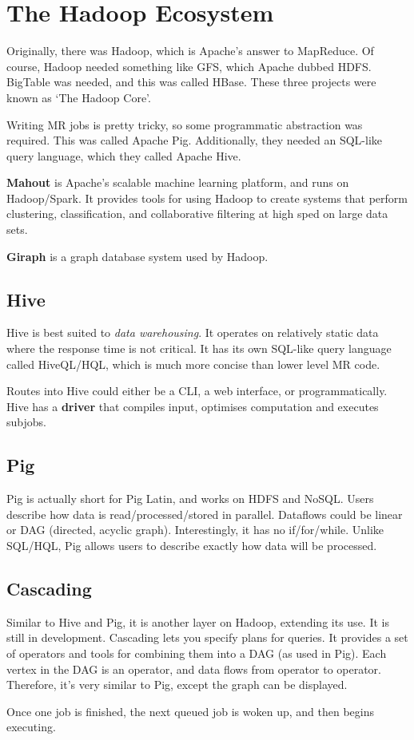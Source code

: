 \documentclass[11pt,a4paper,titlepage,dvipsnames,cmyk]{scrartcl}
\begin{document}
\section{The Hadoop Ecosystem}
Originally, there was Hadoop, which is Apache's answer to MapReduce. Of course, Hadoop needed something like GFS, which Apache dubbed HDFS.
BigTable was needed, and this was called HBase. These three projects were known as `The Hadoop Core'.

Writing MR jobs is pretty tricky, so some programmatic abstraction was required. This was called Apache Pig. Additionally, they needed an SQL-like query language, which they called Apache Hive.

\textbf{Mahout} is Apache's scalable machine learning platform, and runs on Hadoop/Spark. It provides tools for using Hadoop to create systems that perform clustering, classification, and collaborative filtering at high sped on large data sets.

\textbf{Giraph} is a graph database system used by Hadoop.

\subsection{Hive}
Hive is best suited to \textit{data warehousing}. It operates on relatively static data where the response time is not critical. It has its own SQL-like query language called HiveQL/HQL, which is much more concise than lower level MR code.

Routes into Hive could either be a CLI, a web interface, or programmatically. Hive has a \textbf{driver} that compiles input, optimises computation and executes subjobs.

\subsection{Pig}
Pig is actually short for Pig Latin, and works on HDFS and NoSQL. Users describe how data is read/processed/stored in parallel. Dataflows could be linear or DAG (directed, acyclic graph). Interestingly, it has no if/for/while. Unlike SQL/HQL, Pig allows users to describe exactly how data will be processed.

\subsection{Cascading}
Similar to Hive and Pig, it is another layer on Hadoop, extending its use. It is still in development. Cascading lets you specify plans for queries. It provides a set of operators and tools for combining them into a DAG (as used in Pig). Each vertex in the DAG is an operator, and data flows from operator to operator. Therefore, it's very similar to Pig, except the graph can be displayed.

Once one job is finished, the next queued job is woken up, and then begins executing.
\end{document}

